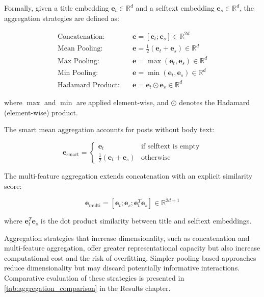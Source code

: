 Formally, given a title embedding $\mathbf{e}_t \in \mathbb{R}^d$ and a selftext embedding $\mathbf{e}_s \in \mathbb{R}^d$, the aggregation strategies are defined as:

\begin{align}
\text{Concatenation:} \quad & \mathbf{e} = [\mathbf{e}_t; \mathbf{e}_s] \in \mathbb{R}^{2d} \\
\text{Mean Pooling:} \quad & \mathbf{e} = \frac{1}{2}(\mathbf{e}_t + \mathbf{e}_s) \in \mathbb{R}^{d} \\
\text{Max Pooling:} \quad & \mathbf{e} = \max(\mathbf{e}_t, \mathbf{e}_s) \in \mathbb{R}^{d} \\
\text{Min Pooling:} \quad & \mathbf{e} = \min(\mathbf{e}_t, \mathbf{e}_s) \in \mathbb{R}^{d} \\
\text{Hadamard Product:} \quad & \mathbf{e} = \mathbf{e}_t \odot \mathbf{e}_s \in \mathbb{R}^{d}
\end{align}

where $\max$ and $\min$ are applied element-wise, and $\odot$ denotes the Hadamard (element-wise) product.

The smart mean aggregation accounts for posts without body text:

\begin{equation}
\mathbf{e}_{\text{smart}} = \begin{cases}
\mathbf{e}_t & \text{if selftext is empty} \\
\frac{1}{2}(\mathbf{e}_t + \mathbf{e}_s) & \text{otherwise}
\end{cases}
\end{equation}

The multi-feature aggregation extends concatenation with an explicit similarity score:

\begin{equation}
\mathbf{e}_{\text{multi}} = [\mathbf{e}_t; \mathbf{e}_s; \mathbf{e}_t^T \mathbf{e}_s] \in \mathbb{R}^{2d+1}
\end{equation}

where $\mathbf{e}_t^T \mathbf{e}_s$ is the dot product similarity between title and selftext embeddings.

Aggregation strategies that increase dimensionality, such as concatenation and multi-feature aggregation, offer greater representational capacity but also increase computational cost and the risk of overfitting. Simpler pooling-based approaches reduce dimensionality but may discard potentially informative interactions. Comparative evaluation of these strategies is presented in \autoref{tab:aggregation_comparison} in the Results chapter.


